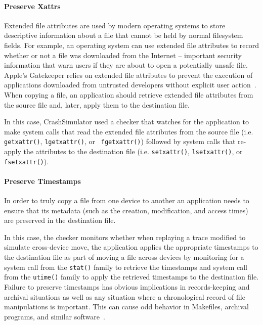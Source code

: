 \paragraph{Preserve Xattrs}

Extended file attributes are used by modern operating systems to store
descriptive information about a file that cannot be held by normal
filesystem fields.  For example, an operating system can use extended file
attributes to record whether or not a file was downloaded from the Internet
-- important security information that warn users if they are about to open
a potentially unsafe file.  Apple's Gatekeeper relies on extended file
attributes to prevent the execution of applications downloaded from
untrusted developers without explicit user action~\cite{AppleCodeSigning}.
When copying a file, an application should retrieve extended file
attributes from the source file and, later, apply them to the destination
file.

In this case, CrashSimulator used a checker that watches for the
application to make system calls that read the extended file attributes
from the source file (i.e. {\tt getxattr()}, {\tt lgetxattr()}, or {\tt
fgetxattr()}) followed by system calls that re-apply the attributes to the
destination file (i.e. {\tt setxattr()}, {\tt lsetxattr()}, or {\tt
fsetxattr()}).

\paragraph{Preserve Timestamps}

In order to truly copy a file from one device to another an application
needs to ensure that its metadata (such as the creation, modification, and
access times) are preserved in the destination file.

In this case, the checker monitors whether when replaying a trace modified
to simulate cross-device move, the application applies the appropriate
timestamps to the destination file as part of moving a file across devices
by monitoring for a system call from the {\tt stat()} family to retrieve
the timestamps and system call from the {\tt utime()} family to apply the
retrieved timestamps to the destination file.  Failure to preserve
timestamps has obvious implications in records-keeping and archival
situations as well as any situation where a chronological record of file
manipulations is important.  This can cause odd behavior in Makefiles,
archival programs, and similar software~\cite{NautilusTimestamps,
SudoTimestamp}.

